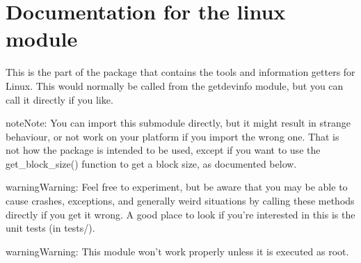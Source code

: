 \documentclass[letterpaper,10pt,english]{sphinxmanual}
\begin{document}
\chapter{Documentation for the linux module}
\label{\detokenize{linux:module-getdevinfo.linux}}\label{\detokenize{linux:documentation-for-the-linux-module}}\label{\detokenize{linux::doc}}
This is the part of the package that contains the tools and information
getters for Linux. This would normally be called from the getdevinfo
module, but you can call it directly if you like.

\begin{sphinxadmonition}{note}{Note:}
You can import this submodule directly, but it might result
in strange behaviour, or not work on your platform if you
import the wrong one. That is not how the package is intended
to be used, except if you want to use the get\_block\_size()
function to get a block size, as documented below.
\end{sphinxadmonition}

\begin{sphinxadmonition}{warning}{Warning:}
Feel free to experiment, but be aware that you may be able to
cause crashes, exceptions, and generally weird situations by calling
these methods directly if you get it wrong. A good place to
look if you’re interested in this is the unit tests (in tests/).
\end{sphinxadmonition}

\begin{sphinxadmonition}{warning}{Warning:}
This module won’t work properly unless it is executed as root.
\end{sphinxadmonition}
\end{document}
